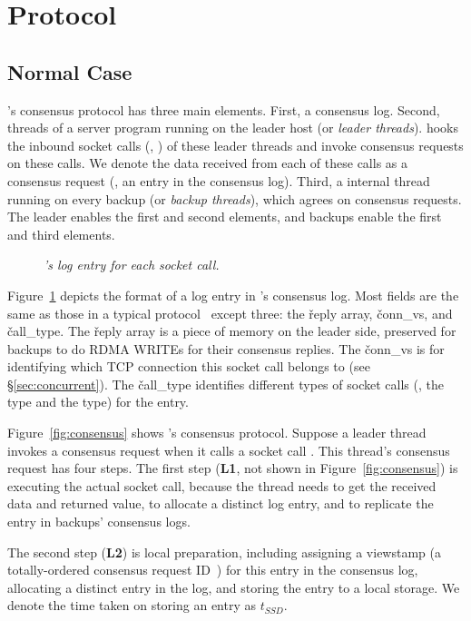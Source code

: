 \section{Protocol} \label{sec:protocol}

\subsection{Normal Case} \label{sec:normal}
\xxx's consensus protocol has three main elements. 
First, a \paxos consensus log. Second, threads of a server program running on 
the leader host (or \emph{leader threads}). \xxx hooks the inbound socket calls 
(\eg, \recv) of these leader threads and invoke consensus requests on these 
calls. We denote the data received from each of these calls as a consensus 
request (\ie, an entry in the consensus log). Third, a \xxx internal thread 
running on every backup (or \emph{backup threads}), which agrees on consensus 
requests. The \xxx leader enables the first and second elements, and backups 
enable the first and third elements.

\begin{figure}[h]
\caption{{\em \xxx's log entry for each socket call.}}
\label{fig:logentry}
\end{figure}

Figure~\ref{fig:logentry} depicts the format of a log entry in \xxx's consensus 
log. Most fields are the same as those in a typical \paxos 
protocol~\cite{paxos:practical} except three: the \v{reply} array, 
\v{conn\_vs}, and \v{call\_type}. 
The \v{reply} array is a piece of memory on the leader side, preserved for
backups to do RDMA WRITEs for their consensus replies.
The \v{conn\_vs} is for identifying
which TCP connection this socket call belongs to (see \S\ref{sec:concurrent}). 
The \v{call\_type} identifies different types of socket calls (\eg, the \accept 
type and the \recv type) for the entry.

Figure~\ref{fig:consensus} shows \xxx's consensus protocol. Suppose a leader 
thread invokes a consensus request when it calls a socket call \recv. This 
thread's consensus request has four steps. The first step (\textbf{L1}, not 
shown in Figure~\ref{fig:consensus}) is executing the actual socket call, 
because the thread needs to get the received data and returned value, to 
allocate a distinct log entry, and to replicate the entry in backups' consensus 
logs.

The second step (\textbf{L2}) is local preparation, including assigning a 
viewstamp (a totally-ordered \paxos consensus request 
ID~\cite{paxos:practical}) 
for this entry in the consensus log, allocating a distinct entry in the log, 
and 
storing the entry to a local storage. We denote the time 
taken on storing an entry as $t_{SSD}$.

